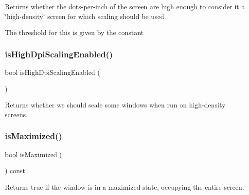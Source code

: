 Returns whether the dots-\/per-\/inch of the screen are high enough to consider it a \char`\"{}high-\/density\char`\"{} screen for which scaling should be used. 

The threshold for this is given by the constant \mbox{\label{classsgl_1_1GWindow_a040690336154a3f414001a16ffdb947e}} 
\subsubsection{\texorpdfstring{is\+High\+Dpi\+Scaling\+Enabled()}{isHighDpiScalingEnabled()}}
{\footnotesize\ttfamily bool is\+High\+Dpi\+Scaling\+Enabled (\begin{DoxyParamCaption}{ }\end{DoxyParamCaption})\hspace{0.3cm}{\ttfamily [static]}}



Returns whether we should scale some windows when run on high-\/density screens. 

\mbox{\label{classsgl_1_1GWindow_a28e910de88f3ff5419710b0b0a03c2bb}} 
\subsubsection{\texorpdfstring{is\+Maximized()}{isMaximized()}}
{\footnotesize\ttfamily bool is\+Maximized (\begin{DoxyParamCaption}{ }\end{DoxyParamCaption}) const\hspace{0.3cm}{\ttfamily [virtual]}}



Returns true if the window is in a maximized state, occupying the entire screen. 

\mbox{\label{classsgl_1_1GWindow_a14e6f95fa2c9ec543caa7f16f30c53d6}} 

